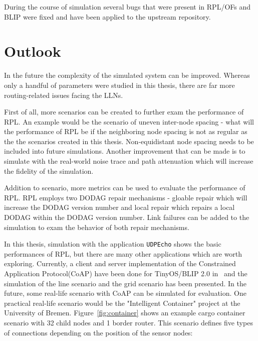 During the course of simulation several bugs that were present in RPL/OFs and BLIP were fixed and have been applied to the upstream repository.

\section{Outlook}
\label{outlook}




In the future the complexity of the simulated system can be improved. Whereas only a handful of parameters were studied in this thesis, there are far more routing-related issues facing the LLNs.
 
First of all, more scenarios can be created to further exam the performance of RPL. An example would be the scenario of uneven inter-node spacing - what will the performance of RPL be if the neighboring node spacing is not as regular as the the scenarios created in this thesis. Non-equidistant node spacing needs to be included into future simulations. Another improvement that can be made is to simulate with the real-world noise trace and path attenuation which will increase the fidelity of the simulation. 

Addition to scenario, more metrics can be used to evaluate the performance of RPL. RPL employs two DODAG repair mechanisms - gloable repair which will increase the DODAG version number and local repair which repairs  a local DODAG within the DODAG version number. Link failures can be added to the simulation to exam the behavior of both repair mechanisms.

In this thesis, simulation with the application \texttt{UDPEcho} shows the basic performances of RPL, but there are many other applications which are worth exploring. Currently, a client and server implementation of the Constrained Application Protocol(CoAP) have been done for TinyOS/BLIP 2.0 in~\cite{TP11} and the simulation of the line scenario and the grid scenario has been presented. In the future, some real-life scenario with CoAP can be simulated for evaluation. One practical real-life scenario would be the "Intelligent Container" project at the University of Bremen. Figure~\ref{fig:container} shows an example cargo container scenario with 32 child nodes and 1 border router. This scenario defines five types of connections depending on the position of the sensor nodes:

